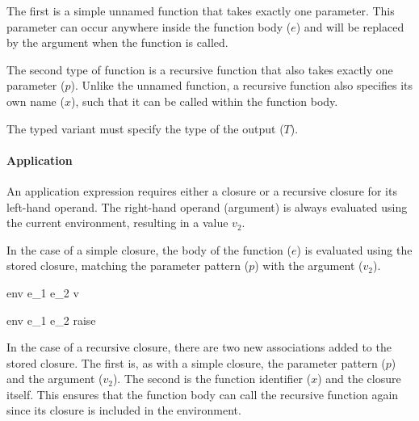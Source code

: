 \documentclass{article}
\begin{document}
\smallskip

The first is a simple unnamed function that takes exactly one parameter.
This parameter can occur anywhere inside the function body ($e$) and will be replaced by the argument when the function is called.


The second type of function is a recursive function that also takes exactly one parameter ($p$).
Unlike the unnamed function, a recursive function also specifies its own name ($x$), such that it can be called within the function body.

The typed variant must specify the type of the output ($T$).



\paragraph{Application}
An application expression requires either a closure or a recursive closure for its left-hand operand.
The right-hand operand (argument) is always evaluated using the current environment, resulting in a value $v_2$.

\smallskip

In the case of a simple closure, the body of the function ($e$) is evaluated using the stored closure, matching the parameter pattern ($p$) with the argument ($v_2$).

    {\mbox{env} \vdash e_1 \; e_2 \Downarrow v}

    {\mbox{env} \vdash e_1 \; e_2 \Downarrow raise}

In the case of a recursive closure, there are two new associations added to the stored closure.
The first is, as with a simple closure, the parameter pattern ($p$) and the argument ($v_2$).
The second is the function identifier ($x$) and the closure itself.
This ensures that the function body can call the recursive function again since its closure is included in the environment.
\end{document}
